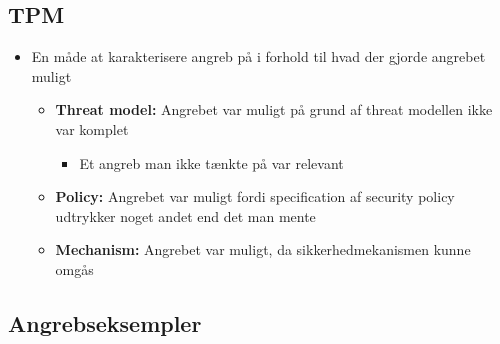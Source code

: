 \documentclass[a4, english]{article}
\begin{document}
\subsection{TPM}
\begin{itemize}
	\item En måde at karakterisere angreb på i forhold til hvad der gjorde angrebet muligt  
  \begin{itemize}
  	\item \textbf{Threat model:} Angrebet var muligt på grund af threat modellen ikke var komplet 
    \begin{itemize}
    	\item Et angreb man ikke tænkte på var relevant 
    \end{itemize}
    \item \textbf{Policy:} Angrebet var muligt fordi specification af security policy udtrykker noget andet end det man mente
    \item \textbf{Mechanism:} Angrebet var muligt, da sikkerhedmekanismen kunne omgås 
  \end{itemize}
\end{itemize} 

\subsection{Angrebseksempler}
\end{document}
